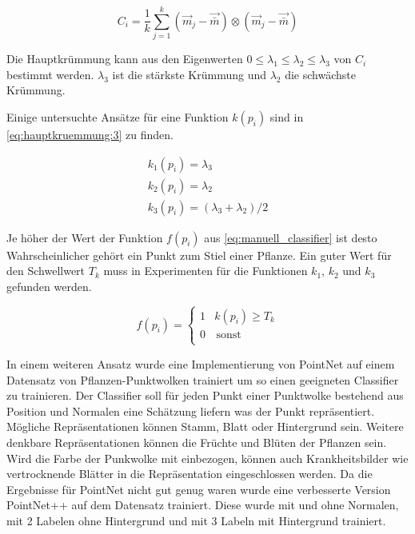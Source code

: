 \documentclass[12pt,titlepage, twoside]{article}
\begin{document}
\begin{equation}
\label{eq:hauptkruemmung:2}
C_i = \frac{1}{k} \sum_{j=1}^k{(\vec{m}_j - \vec{\bar{m}}) \otimes (\vec{m}_j - \vec{\bar{m}})}
\end{equation}

Die Hauptkrümmung kann aus den Eigenwerten $0 \leq \lambda_1 \leq \lambda_2 \leq \lambda_3$ von $C_i$ bestimmt werden. $\lambda_3$ ist die stärkste Krümmung und $\lambda_2$ die schwächste Krümmung.

Einige untersuchte Ansätze für eine Funktion $k(p_i)$ sind in \ref{eq:hauptkruemmung:3} zu finden. 

\begin{equation}
\label{eq:hauptkruemmung:3}
\begin{array}{ll}
k_1(p_i) = \lambda_3 \\
k_2(p_i) = \lambda_2 \\
k_3(p_i) = (\lambda_3 + \lambda_2) / 2 
\end{array}{}
\end{equation}

Je höher der Wert der Funktion $f(p_i)$ aus \ref{eq:manuell_classifier} ist desto Wahrscheinlicher gehört ein Punkt zum Stiel einer Pflanze. Ein guter Wert für den Schwellwert $T_k$ muss in Experimenten für die Funktionen $k_1$, $k_2$ und $k_3$ gefunden werden.

\begin{equation}
\label{eq:manuell_classifier}
f(p_i) = \left\{
\begin{array}{ll}
1 & k(p_i) \geq T_k \\
0 & \, \textrm{sonst} \\
\end{array}
\right. 
\end{equation}

In einem weiteren Ansatz wurde eine Implementierung von PointNet auf einem Datensatz von Pflanzen-Punktwolken trainiert um so einen geeigneten Classifier zu trainieren. 
Der Classifier soll für jeden Punkt einer Punktwolke bestehend aus Position und Normalen eine Schätzung liefern was der Punkt repräsentiert. Mögliche Repräsentationen können Stamm, Blatt oder Hintergrund sein.
Weitere denkbare Repräsentationen können die Früchte und Blüten der Pflanzen sein. Wird die Farbe der Punkwolke mit einbezogen, können auch Krankheitsbilder wie vertrocknende Blätter in die Repräsentation eingeschlossen werden.  
Da die Ergebnisse für PointNet nicht gut genug waren wurde eine verbesserte Version PointNet++ auf dem Datensatz trainiert. Diese wurde mit und ohne Normalen, mit 2 Labelen ohne Hintergrund und mit 3 Labeln mit Hintergrund trainiert.
\end{document}
